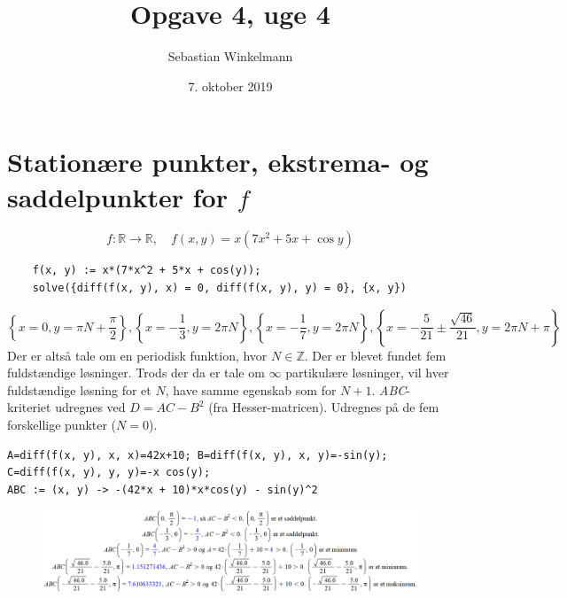 \documentclass{report}
\title{Opgave 4, uge 4}
\author{Sebastian Winkelmann}
\date{7. oktober 2019}
\begin{document}

\setcounter{chapter}{6}
\section{Stationære punkter, ekstrema- og saddelpunkter for $f$}
\begin{equation}
    f:\mathbb{R}\to \mathbb{R},\quad f(x,y)=x(7x^2+5x+\cos{y})
\end{equation}
\begin{verbatim}
    f(x, y) := x*(7*x^2 + 5*x + cos(y)); 
    solve({diff(f(x, y), x) = 0, diff(f(x, y), y) = 0}, {x, y})
\end{verbatim}
$$\left\{x=0,y=\pi N+\frac{\pi}{2}\right\},\left\{x=-\frac{1}{3},y=2\pi N\right\},\left\{x=-\frac{1}{7},y=2\pi N\right\},\left\{x=-\frac{5}{21}\pm\frac{\sqrt{46}}{21},y=2\pi N+\pi\right\}$$
Der er altså tale om en periodisk funktion, hvor $N\in\mathbb{Z}$. Der er blevet fundet fem fuldstændige løsninger. Trods der da er tale om $\infty$ partikulære løsninger, vil hver fuldstændige løsning for et $N$, have samme egenskab som for $N+1$.
\textit{ABC}-kriteriet udregnes ved $D=AC-B^2$ (fra Hesser-matricen). Udregnes på de fem forskellige punkter ($N=0$).
\begin{verbatim}
A=diff(f(x, y), x, x)=42x+10; B=diff(f(x, y), x, y)=-sin(y); C=diff(f(x, y), y, y)=-x cos(y);
ABC := (x, y) -> -(42*x + 10)*x*cos(y) - sin(y)^2\end{verbatim}
\begin{figure}[H]
    \centering
    \includegraphics[width=\textwidth]{javaw_dy1LWMBxYA.png}
\end{figure}
\end{document}
